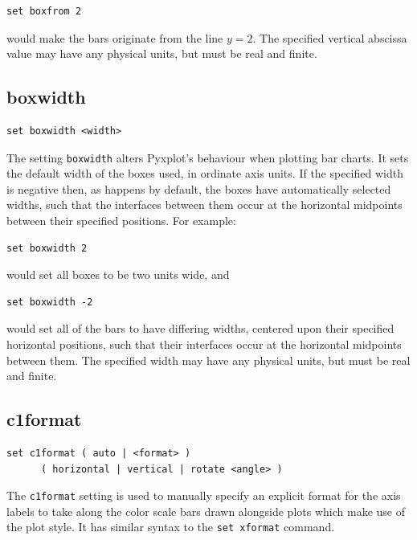 \begin{verbatim}
set boxfrom 2
\end{verbatim}

\noindent would make the bars originate from the line $y=2$. The specified
vertical abscissa value may have any physical units, but must be real and
finite.



\subsection{boxwidth}

\begin{verbatim}
set boxwidth <width>
\end{verbatim}

The setting {\tt boxwidth} alters Pyxplot's behaviour when plotting bar charts.
It sets the default width of the boxes used, in ordinate axis units.  If the
specified width is negative then, as happens by default, the boxes have
automatically selected widths, such that the interfaces between them occur at
the horizontal midpoints between their specified positions.  For example:

\begin{verbatim}
set boxwidth 2
\end{verbatim}

\noindent would set all boxes to be two units wide, and

\begin{verbatim}
set boxwidth -2
\end{verbatim}

\noindent would set all of the bars to have differing widths, centered upon
their specified horizontal positions, such that their interfaces occur at the
horizontal midpoints between them. The specified width may have any physical
units, but must be real and finite.


\subsection{c1format}

\begin{verbatim}
set c1format ( auto | <format> )
      ( horizontal | vertical | rotate <angle> )
\end{verbatim}

The {\tt c1format} setting is used to manually specify an explicit format for
the axis labels to take along the color scale bars drawn alongside plots which
make use of the  plot style. It has similar syntax to the
{\tt set xformat} command.


